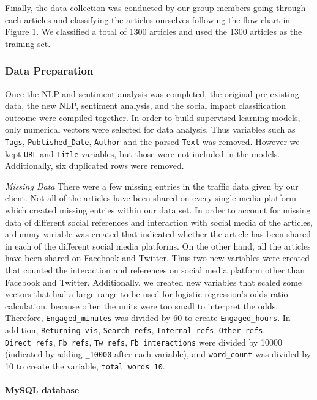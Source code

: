\documentclass[10pt,letterpaper]{article}
\begin{document}
Finally, the data collection was conducted by our group members going
through each articles and classifying the articles ourselves following
the flow chart in Figure 1. We classified a total of 1300 articles and
used the 1300 articles as the training set.

\hypertarget{data-preparation}{%
\subsubsection{Data Preparation}\label{data-preparation}}

Once the NLP and sentiment analysis was completed, the original
pre-existing data, the new NLP, sentiment analysis, and the social
impact classification outcome were compiled together. In order to build
supervised learning models, only numerical vectors were selected for
data analysis. Thus variables such as \texttt{Tags},
\texttt{Published\_Date}, \texttt{Author} and the parsed \texttt{Text}
was removed. However we kept \texttt{URL} and \texttt{Title} variables,
but those were not included in the models. Additionally, six duplicated
rows were removed.

\emph{Missing Data} There were a few missing entries in the traffic data
given by our client. Not all of the articles have been shared on every
single media platform which created missing entries within our data set.
In order to account for missing data of different social references and
interaction with social media of the articles, a dummy variable was
created that indicated whether the article has been shared in each of
the different social media platforms. On the other hand, all the
articles have been shared on Facebook and Twitter. Thus two new
variables were created that counted the interaction and references on
social media platform other than Facebook and Twitter. Additionally, we
created new variables that scaled some vectors that had a large range to
be used for logistic regression's odds ratio calculation, because often
the units were too small to interpret the odds. Therefore,
\texttt{Engaged\_minutes} was divided by 60 to create
\texttt{Engaged\_hours}. In addition, \texttt{Returning\_vis},
\texttt{Search\_refs}, \texttt{Internal\_refs}, \texttt{Other\_refs},
\texttt{Direct\_refs}, \texttt{Fb\_refs}, \texttt{Tw\_refs},
\texttt{Fb\_interactions} were divided by 10000 (indicated by adding
\texttt{\_10000} after each variable), and \texttt{word\_count} was
divided by 10 to create the variable, \texttt{total\_words\_10}.

\hypertarget{mysql-database}{%
\paragraph{MySQL database}\label{mysql-database}}
\end{document}
